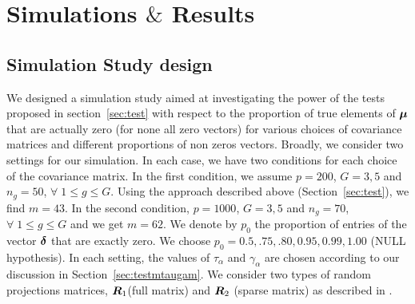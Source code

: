 \documentclass[12pt]{article}
\def\bzero{{\mathbf 0}}
\def\log{\hbox{log}}
\def\log{\hbox{log}}
\def\bzero{{\mathbf 0}}
\newcommand{\uR}       {\mbox{\boldmath$R$}}
\newcommand{\udelta}            {\mbox{\boldmath$\delta$}}
\newcommand{\umu}               {\mbox{\boldmath$\mu$}}
\begin{document}
\section{Simulations $\&$ Results} \label{sec:simul}

\subsection{Simulation Study design}
We designed a simulation study aimed at investigating the power of the tests proposed in section~\ref{sec:test}
with respect to the proportion of true elements of $\umu$ that are actually zero (for none all zero vectors) for various choices of covariance matrices and different proportions of non zeros vectors.
Broadly, we consider two settings for our simulation. In each case, we have two conditions for each choice of the covariance matrix. 
In the first condition, we assume $p = 200$, $G=3, 5$ and $n_g = 50$, $\forall\; 1 \leq g \leq G$. Using the approach described above (Section~\ref{sec:test}), we find $m = 43$.
In the second condition, $p = 1000$, $G=3, 5$ and $n_g = 70$, $\forall\; 1 \leq g \leq G$ and we get $m = 62$. We denote by $p_0$ the proportion of entries of the vector $\udelta$ that are exactly zero. We choose $p_0 = 0.5, .75, .80, 0.95, 0.99, 1.00$ (NULL hypothesis).
In each setting, the values of $\tau_{\alpha}$ and $\gamma_{\alpha}$ are chosen according to our discussion in Section~\ref{sec:testmtaugam}. We consider two types of random projections matrices, $\uR_{1}$(full matrix)  and $\uR_2$ (sparse matrix) as described in \citealp{srivastava2014raptt,zoh2018powerful}.
\end{document}
